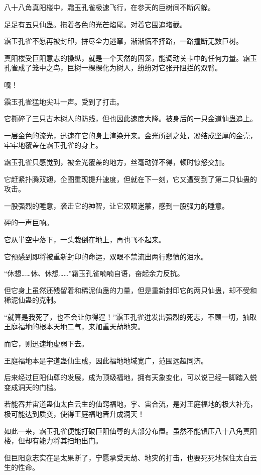 \begin{this_body}
八十八角真阳楼中，霜玉孔雀极速飞行，在参天的巨树间不断闪躲。

足足有五只仙蛊。拖着各色的光芒焰尾。对着它围追堵截。

霜玉孔雀不愿再被封印，拼尽全力逃窜，渐渐慌不择路，一路撞断无数巨树。

真阳楼受巨阳意志的操纵，就是一个天然的囚笼，能调动关卡中的任何力量。霜玉孔雀成了笼中之鸟，巨树一棵棵化为树人，纷纷对它张开阻拦的双臂。

嘎！

霜玉孔雀猛地尖叫一声。受到了打击。

它撕碎了三只古木树人的防线，但也因此速度大降。被身后的一只金道仙蛊追上。

一层金色的流光，迅速在它的身上渲染开来。金光所到之处，凝结成坚厚的金壳，牢牢地覆盖在霜玉孔雀的身上。

霜玉孔雀只感觉到，被金光覆盖的地方，丝毫动弹不得，顿时惊怒交加。

它赶紧扑腾双翅，企图重现提升速度，但就在下一刻，它又遭受到了第二只仙蛊的攻击。

一股强烈的睡意，袭击它的神智，让它双眼迷蒙，感到一股强力的睡意。

砰的一声巨响。

它从半空中落下，一头栽倒在地上，再也飞不起来。

它预感到即将被重新封印的命运，双眼不禁流出两行悲愤的泪水。

“休想……休、休想……”霜玉孔雀喃喃自语，奋起余力反抗。

但它身上虽然还残留着和稀泥仙蛊的力量，但是重新封印它的两只仙蛊，却不受和稀泥仙蛊的克制。

“就算是我死了，也不会让你得逞！”霜玉孔雀迸发出强烈的死志，不顾一切，抽取王庭福地的根本天地二气，来加重天劫地灾。

而它，则迅速地虚弱下去。

王庭福地本是宇道蛊仙生成，因此福地地域宽广，范围远超同济。

后来经过巨阳仙尊的发展，成为顶级福地，拥有天象变化，可以说已经一脚踏入蜕变成洞天的门槛。

若能吞并宙道蛊仙太白云生的仙窍福地，宇、宙合流，是对王庭福地的极大补充，极可能达到质变，使得王庭福地晋升成洞天！

如此一来，霜玉孔雀便能打破巨阳仙尊的大部分布置。虽然不能镇压八十八角真阳楼，但却有能力将其扫地出门。

但巨阳意志实在是太果断了，宁愿承受天劫、地灾的打击，也要死死地保住太白云生的性命。


\end{this_body}
